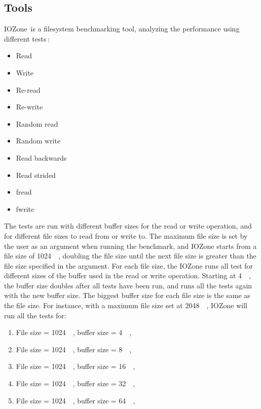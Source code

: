 \begin{enumerate}
\subsection{Tools}
IOZone\,\cite{IozoneFilesystemBenchmark} is a filesystem benchmarking tool, analyzing the performance using different tests\,\cite{iozoneIozoneFilesystemBenchmark}:
\begin{itemize}
	\item Read
	\item Write
	\item Re-read
	\item Re-write
	\item Random read
	\item Random write
	\item Read backwards
	\item Read strided
	\item fread
	\item fwrite
\end{itemize}
The tests are run with different buffer sizes for the read or write operation, and for different file sizes to read from or write to. The maximum file size is set by the user as an argument when running the benchmark, and IOZone starts from a file size of \SI{1024}{\kilo\byte}, doubling the file size until the next file size is greater than the file size specified in the argument. For each file size, the IOZone runs all test for different sizes of the buffer used in the read or write operation. Starting at \SI{4}{\kilo\byte}, the buffer size doubles after all tests have been run, and runs all the tests again with the new buffer size. The biggest buffer size for each file size is the same as the file size. For instance, with a maximum file size set at \SI{2048}{\kilo\byte}, IOZone will run all the tests for:
\begin{enumerate}
	\item File size = \SI{1024}{\kilo\byte}, buffer size = \SI{4}{\kilo\byte},
	\item File size = \SI{1024}{\kilo\byte}, buffer size = \SI{8}{\kilo\byte},
	\item File size = \SI{1024}{\kilo\byte}, buffer size = \SI{16}{\kilo\byte},
	\item File size = \SI{1024}{\kilo\byte}, buffer size = \SI{32}{\kilo\byte},
	\item File size = \SI{1024}{\kilo\byte}, buffer size = \SI{64}{\kilo\byte},

\end{enumerate}
\end{enumerate}
